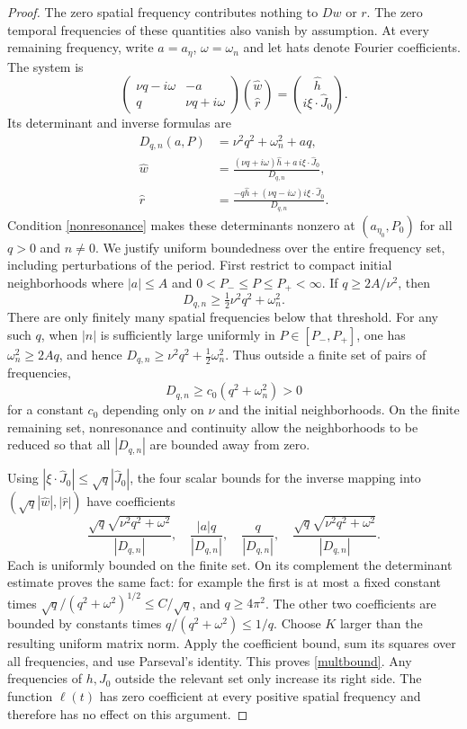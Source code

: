 \documentclass[11pt]{article}
\begin{document}
\begin{proof}
The zero spatial frequency contributes nothing to $Dw$ or $r$.
The zero temporal frequencies of these quantities also vanish by
assumption. At every remaining frequency, write $a=a_\eta$,
$\omega=\omega_n$ and let hats denote Fourier coefficients.
The system is
\[
 \begin{pmatrix}\nu q-i\omega&-a\\q&\nu q+i\omega\end{pmatrix}
 \binom{\widehat w}{\widehat r}
   =\binom{\widehat h}{i\xi\cdot\widehat J_0}.
\]
Its determinant and inverse formulas are
\begin{align*}
 D_{q,n}(a,P)&=\nu^2q^2+\omega_n^2+a q,\\
 \widehat w&=\frac{(\nu q+i\omega)\widehat h
                         +a\,i\xi\cdot\widehat J_0}{D_{q,n}},\\
 \widehat r&=\frac{-q\widehat h
                     +(\nu q-i\omega)i\xi\cdot\widehat J_0}{D_{q,n}}.
\end{align*}
Condition \eqref{nonresonance} makes these determinants nonzero at
$(a_{\eta_0},P_0)$ for all $q>0$ and $n\ne0$.
We justify uniform boundedness over the entire frequency set, including
perturbations of the period. First restrict to compact initial
neighborhoods where $|a|\leq A$ and $0<P_-\leq P\leq P_+<\infty$.
If $q\geq2A/\nu^2$, then
\[
 D_{q,n}\geq\tfrac12\nu^2q^2+\omega_n^2.
\]
There are only finitely many spatial frequencies below that threshold.
For any such $q$, when $|n|$ is sufficiently large uniformly in
$P\in[P_-,P_+]$, one has $\omega_n^2\geq2Aq$, and hence
$D_{q,n}\geq\nu^2q^2+\tfrac12\omega_n^2$.
Thus outside a finite set of pairs of frequencies,
\[
 D_{q,n}\geq c_0(q^2+\omega_n^2)>0
\]
for a constant $c_0$ depending only on $\nu$ and the initial
neighborhoods. On the finite remaining set, nonresonance and continuity
allow the neighborhoods to be reduced so that all $|D_{q,n}|$ are
bounded away from zero.

Using $|\xi\cdot\widehat J_0|\leq\sqrt q|\widehat J_0|$,
the four scalar bounds for the inverse mapping into
$(\sqrt q|\widehat w|,|\widehat r|)$ have coefficients
\[
 \frac{\sqrt q\sqrt{\nu^2q^2+\omega^2}}{|D_{q,n}|},\quad
 \frac{|a|q}{|D_{q,n}|},\quad
 \frac{q}{|D_{q,n}|},\quad
 \frac{\sqrt q\sqrt{\nu^2q^2+\omega^2}}{|D_{q,n}|}.
\]
Each is uniformly bounded on the finite set. On its complement the
determinant estimate proves the same fact: for example the first is at
most a fixed constant times
$\sqrt q/(q^2+\omega^2)^{1/2}\leq C/\sqrt q$, and
$q\geq4\pi^2$. The other two coefficients are bounded by constants
times $q/(q^2+\omega^2)\leq1/q$.
Choose $K$ larger than the resulting uniform matrix norm.
Apply the coefficient bound, sum its squares over all frequencies, and
use Parseval's identity. This proves \eqref{multbound}. Any frequencies
of $h,J_0$ outside the relevant set only increase its right side. The
function $\ell(t)$ has zero coefficient at every positive spatial
frequency and therefore has no effect on this argument.
\end{proof}
\end{document}
